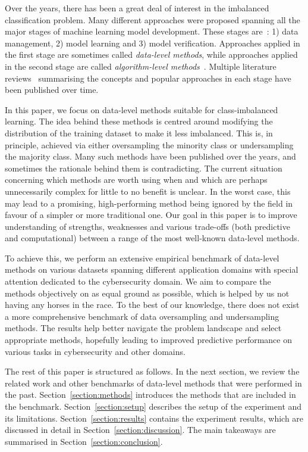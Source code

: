 \documentclass[conference]{IEEEtran}
\begin{document}
Over the years, there has been a great deal of interest in the imbalanced classification problem.
Many different approaches were proposed spanning all the major stages of machine learning model
development. These stages are~\cite{ml-lifecycle}: 1) data management, 2) model learning and 3)
model verification. Approaches applied in the first stage are sometimes called \emph{data-level
methods}, while approaches applied in the second stage are called \emph{algorithm-level
methods}~\cite{johnson2019}. Multiple literature reviews~\cite{chawla2009, kotsiantis2006,
sokolova2009, learning-from-imb-data, johnson2019} summarising the concepts and popular approaches
in each stage have been published over time.

In this paper, we focus on data-level methods suitable for class-imbalanced learning. The idea
behind these methods is centred around modifying the distribution of the training dataset to make
it less imbalanced. This is, in principle, achieved via either oversampling the minority class or
undersampling the majority class. Many such methods have been published over the years, and
sometimes the rationale behind them is contradicting. The current situation concerning which
methods are worth using when and which are perhaps unnecessarily complex for little to no benefit
is unclear. In the worst case, this may lead to a promising, high-performing method being ignored
by the field in favour of a simpler or more traditional one. Our goal in this paper is to improve
understanding of strengths, weaknesses and various trade-offs (both predictive and computational)
between a range of the most well-known data-level methods.

To achieve this, we perform an extensive empirical benchmark of data-level methods on various
datasets spanning different application domains with special attention dedicated to the
cybersecurity domain. We aim to compare the methods objectively on as equal ground as possible,
which is helped by us not having any horses in the race. To the best of our knowledge, there does
not exist a more comprehensive benchmark of data oversampling and undersampling methods.  The
results help better navigate the problem landscape and select appropriate methods, hopefully
leading to improved predictive performance on various tasks in cybersecurity and other domains.

The rest of this paper is structured as follows. In the next section, we review the related work
and other benchmarks of data-level methods that were performed in the past.
Section~\ref{section:methods} introduces the methods that are included in the benchmark.
Section~\ref{section:setup} describes the setup of the experiment and its limitations.
Section~\ref{section:results} contains the experiment results, which are discussed in detail in
Section~\ref{section:discussion}. The main takeaways are summarised in
Section~\ref{section:conclusion}.
\end{document}
